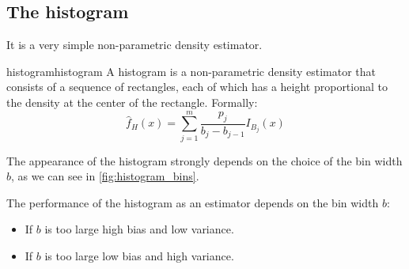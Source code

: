 \subsection{The histogram}
It is a very simple non-parametric density estimator.

\begin{definition}{histogram}{histogram}
	A histogram is a non-parametric density estimator that consists of a sequence of
	rectangles, each of which has a height proportional to the density at the center of
	the rectangle.
	\tcblower
	Formally:
	\begin{equation*}
		\widehat{f}_H(x) = \sum_{j=1}^m \frac{p_j}{b_j - b_{j-1}} I_{B_j}(x)
	\end{equation*}
\end{definition}

The appearance of the histogram strongly depends on the choice of the bin width $b$,
as we can see in \cref{fig:histogram_bins}.

\begin{note}
	The performance of the histogram as an estimator depends on the bin width $b$:
	\begin{itemize}
        \item If $b$ is too large \textrightarrow{} high bias and low variance.
		\item If $b$ is too large \textrightarrow{} low bias and high variance.
	\end{itemize}
\end{note}

